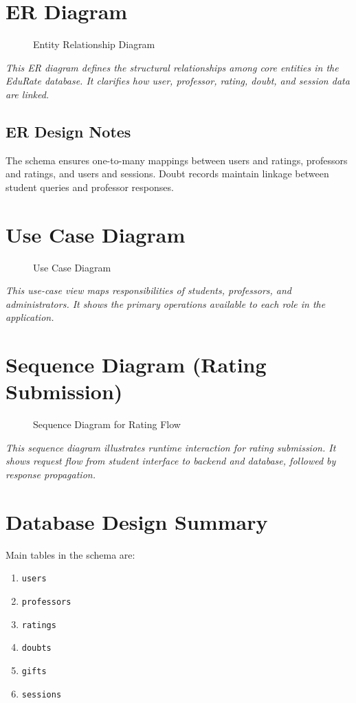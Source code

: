 \section{ER Diagram}
\begin{figure}[H]
\centering

\caption{Entity Relationship Diagram}
\end{figure}
\noindent\textit{This ER diagram defines the structural relationships among core entities in the EduRate database. It clarifies how user, professor, rating, doubt, and session data are linked.}

\subsection*{ER Design Notes}
The schema ensures one-to-many mappings between users and ratings, professors and ratings, and users and sessions. Doubt records maintain linkage between student queries and professor responses.

\section{Use Case Diagram}
\begin{figure}[H]
\centering

\caption{Use Case Diagram}
\end{figure}
\noindent\textit{This use-case view maps responsibilities of students, professors, and administrators. It shows the primary operations available to each role in the application.}

\section{Sequence Diagram (Rating Submission)}
\begin{figure}[H]
\centering

\caption{Sequence Diagram for Rating Flow}
\end{figure}
\noindent\textit{This sequence diagram illustrates runtime interaction for rating submission. It shows request flow from student interface to backend and database, followed by response propagation.}

\section{Database Design Summary}
Main tables in the schema are:
\begin{enumerate}[label=\Alph*., leftmargin=1.5em]
    \item \texttt{users}
    \item \texttt{professors}
    \item \texttt{ratings}
    \item \texttt{doubts}
    \item \texttt{gifts}
    \item \texttt{sessions}
\end{enumerate}

